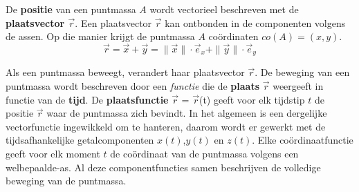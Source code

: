 \documentclass{ximera}
\begin{document}
\begin{definition}
	De \textbf{positie} van een puntmassa \(A\) wordt vectorieel beschreven met de \textbf{plaatsvector \(\vec{r}\)}. %
	Een plaatsvector \(\vec{r}\) kan ontbonden in de componenten volgens de assen.
	Op die manier krijgt de puntmassa \(A\) coördinaten \(co(A) = (x,y)\).  
	\[
	\vec{r} = \vec{x} + \vec{y} = \|\vec{x}\|\cdot\vec{e}_x + \|\vec{y}\|\cdot\vec{e}_y
	\]

\begin{image}[0.3\textwidth]
\end{image}
\end{definition}


Als een puntmassa beweegt, verandert haar plaatsvector \(\vec{r}\).  
De beweging van een puntmassa wordt beschreven door een \textit{functie} die de \textbf{plaats} \(\vec{r}\) weergeeft in functie van de \textbf{tijd}. 
De \textbf{plaatsfunctie} \(\vec{r}\) = \(\vec{r}\)(t) geeft voor elk tijdstip \(t\) de positie \(\vec{r}\) waar de puntmassa zich bevindt. 
In het algemeen is een dergelijke vectorfunctie ingewikkeld om te hanteren, daarom wordt er gewerkt met de tijdsafhankelijke getalcomponenten \(x(t)\),\(y(t)\) en \(z(t)\).
Elke coördinaatfunctie geeft voor elk moment \(t\) de coördinaat van de puntmassa volgens een welbepaalde-as. 
Al deze componentfuncties samen beschrijven de volledige beweging van de puntmassa. 
\end{document}
